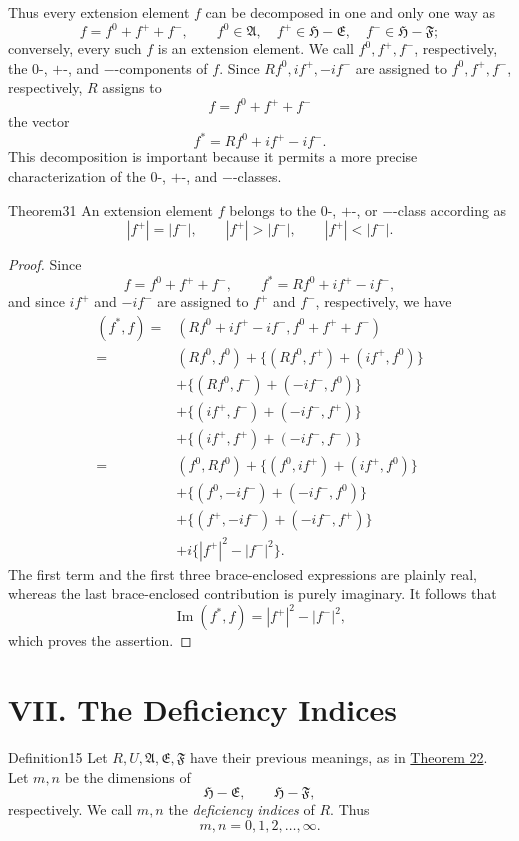 ﻿\documentclass[paper=b5,fontsize=13pt,bookmarkpackage=false,twoside]{scrartcl}
\begin{document}
Thus every extension element $f$ can be decomposed in one and only one way as
\[
f=f^0+f^++f^-,
\qquad
f^0\in\mathfrak A,\quad
f^+\in\mathfrak H-\mathfrak E,\quad
f^-\in\mathfrak H-\mathfrak F;
\]
conversely, every such $f$ is an extension element. We call $f^0,f^+,f^-$, respectively, the $0$-, $+$-, and $-$-components of $f$. Since $Rf^0,if^+,-if^-$ are assigned to $f^0,f^+,f^-$, respectively, $R$ assigns to
\[
f=f^0+f^++f^-
\]
the vector
\[
f^*=Rf^0+if^+-if^-.
\]
This decomposition is important because it permits a more precise characterization of the $0$-, $+$-, and $-$-classes.

\begin{namedstatement}{Theorem}{31}\label{thm:31}
An extension element $f$ belongs to the $0$-, $+$-, or $-$-class according as
\[
|f^+|=|f^-|,\qquad |f^+|>|f^-|,\qquad |f^+|<|f^-|.
\]
\end{namedstatement}

\begin{proof}
Since
\[
f=f^0+f^++f^-,
\qquad
f^*=Rf^0+if^+-if^-,
\]
and since $if^+$ and $-if^-$ are assigned to $f^+$ and $f^-$, respectively, we have
\begin{align*}
(f^*,f)
={}&(Rf^0+if^+-if^-,f^0+f^++f^-)\\
={}&(Rf^0,f^0)
 +\{(Rf^0,f^+)+(if^+,f^0)\}\\
&+\{(Rf^0,f^-)+(-if^-,f^0)\}\\
&+\{(if^+,f^-)+(-if^-,f^+)\}\\
&+\{(if^+,f^+)+(-if^-,f^-)\}\\
={}&(f^0,Rf^0)
 +\{(f^0,if^+)+(if^+,f^0)\}\\
&+\{(f^0,-if^-)+(-if^-,f^0)\}\\
&+\{(f^+,-if^-)+(-if^-,f^+)\}\\
&+i\{|f^+|^2-|f^-|^2\}.
\end{align*}
The first term and the first three brace-enclosed expressions are plainly real, whereas the last brace-enclosed contribution is purely imaginary. It follows that
\[
\operatorname{Im}(f^*,f)=|f^+|^2-|f^-|^2,
\]
which proves the assertion.
\end{proof}

\section*{VII. The Deficiency Indices}\label{chap:VII}

\begin{namedstatement}{Definition}{15}\label{def:15}
Let $R,U,\mathfrak A,\mathfrak E,\mathfrak F$ have their previous meanings, as in \hyperref[thm:22]{Theorem 22}. Let $m,n$ be the dimensions of
\[
\mathfrak H-\mathfrak E,\qquad
\mathfrak H-\mathfrak F,
\]
respectively. We call $m,n$ the \emph{deficiency indices} of $R$. Thus
\[
m,n=0,1,2,\ldots,\infty.
\]
\end{namedstatement}
\end{document}
